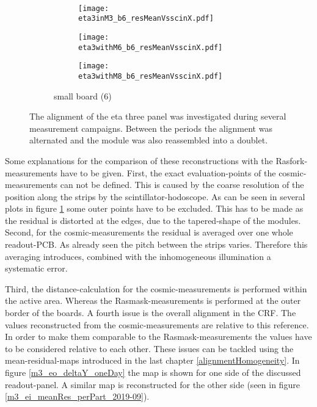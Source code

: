 \documentclass[
twoside,            %
BCOR1.4cm,          %
10pt,               %
headings=normal,    %
headsepline,        %
clearplainpage,		%
final,              %
div=14,
open=right,
bibliography=toc
]{scrreprt}
\begin{document}
\begin{figure}[!h]
\begin{subfigure}[b]{\textwidth}
{		}
	\end{subfigure}
	\\
	\begin{subfigure}[b]{\textwidth}
		\begin{subfigure}[b]{0.32\textwidth}
			\centering
			\texttt{[image: eta3inM3\_b6\_resMeanVsscinX.pdf]}
		\end{subfigure}
		\hfill
		\begin{subfigure}[b]{0.32\textwidth}
			\centering
			\texttt{[image: eta3withM6\_b6\_resMeanVsscinX.pdf]}
		\end{subfigure}
		\hfill
		\begin{subfigure}[b]{0.32\textwidth}
			\centering
			\texttt{[image: eta3withM8\_b6\_resMeanVsscinX.pdf]}
		\end{subfigure}
		\caption{
			small board (6)
		}
	\end{subfigure}
	\vspace{-4mm}
	\caption{
		The alignment of the eta three panel was investigated during several measurement campaigns.
		Between the periods the alignment was alternated and the module was also reassembled into a doublet.
	}
	\label{eta3boardAlignment} 
	\vspace{-4mm}
\end{figure}

Some explanations for the comparison of these reconstructions with the Rasfork-measurements have to be given.
First, the exact evaluation-points of the cosmic-measurements can not be defined.
This is caused by the coarse resolution of the position along the strips by the scintillator-hodoscope.
As can be seen in several plots in figure \ref{eta3boardAlignment} some outer points have to be excluded.
This has to be made as the residual is distorted at the edges, due to the tapered-shape of the modules.
Second, for the cosmic-measurements the residual is averaged over one whole readout-PCB.
As already seen the pitch between the strips varies. 
Therefore this averaging introduces, combined with the inhomogeneous illumination a systematic error.

Third, the distance-calculation for the cosmic-measurements is performed within the active area.
Whereas the Rasmask-measurements is performed at the outer border of the boards.
A fourth issue is the overall alignment in the CRF.
The values reconstructed from the cosmic-measurements are relative to this reference.
In order to make them comparable to the Rasmask-measurements the values have to be considered relative to each other.
These issues can be tackled using the mean-residual-maps introduced in the last chapter \ref{alignmentHomogeneity}.
In figure \ref{m3_eo_deltaY_oneDay} the map is shown for one side of the discussed readout-panel.
A similar map is reconstructed for the other side (seen in figure \ref{m3_ei_meanRes_perPart_2019-09}).
\end{document}
